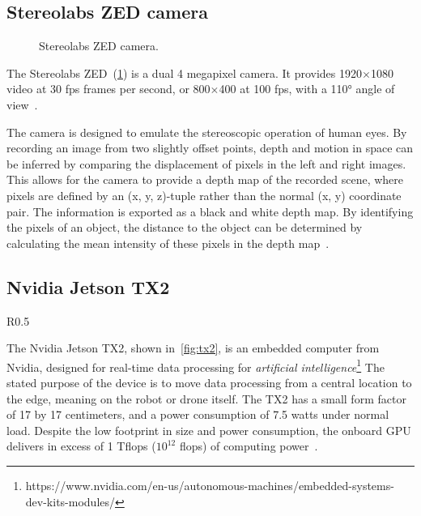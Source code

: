 \documentclass[\rootfolder/main.tex]{subfiles}
\begin{document}

\subsection{Stereolabs ZED camera}

\begin{figure}[h]
    \caption{Stereolabs ZED camera.}
    \label{fig:zed-camera}
\end{figure}

The Stereolabs ZED~(\cref{fig:zed-camera}) is a dual 4 megapixel camera.
It provides 1920$\times$1080 video at 30 \acrfull{fps} frames per second, or 800$\times$400 at 100 \acrshort{fps}, with a \ang{110} angle of view~\cite{Stereolabs}.

The camera is designed to emulate the stereoscopic operation of human eyes.
By recording an image from two slightly offset points, depth and motion in space can be inferred by comparing the displacement of pixels in the left and right images.
This allows for the camera to provide a depth map of the recorded scene, where pixels are defined by an (x, y, z)-tuple rather than the normal (x, y) coordinate pair.
The information is exported as a black and white depth map.
By identifying the pixels of an object, the distance to the object can be determined by calculating the mean intensity of these pixels in the depth map~\cite{Stereolabs}.


\subsection{Nvidia Jetson TX2}

\begin{wrapfigure}{R}{0.5\columnwidth}
    \caption[Nvidia Jetson TX2 development kit.]{Nvidia Jetson TX2 development kit, image courtesy of Nvidia.}
    \label{fig:tx2}
\end{wrapfigure}

The Nvidia Jetson TX2, shown in~\cref{fig:tx2}, is an embedded computer from Nvidia, designed for real-time data processing for \emph{artificial intelligence}\footnote{https://www.nvidia.com/en-us/autonomous-machines/embedded-systems-dev-kits-modules/}
The stated purpose of the device is to move data processing from a central location to the edge, meaning on the robot or drone itself.
The TX2 has a small form factor of 17 by 17 centimeters, and a power consumption of 7.5 watts under normal load.
Despite the low footprint in size and power consumption, the onboard GPU delivers in excess of 1 T\acrshort{flops} ($10^{12}$ \acrlong{flops}) of computing power~\cite{Nvidia2017}.
\end{document}
